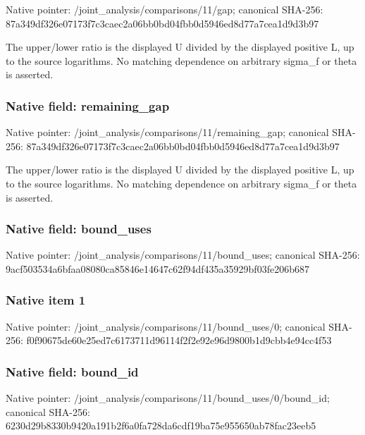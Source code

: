 \documentclass[10pt,a4paper]{article}
\begin{document}
Native pointer: /joint\_analysis/comparisons/11/gap; canonical SHA-256: 87a349df326e07173f7c3cae\allowbreak{}c2a06bb0bd04fbb0d5946ed8\allowbreak{}d77a7cea1d9d3b97


The upper/lower ratio is the displayed U divided by the displayed positive L, up to the source logarithms. No matching dependence on arbitrary sigma\_f or theta is asserted.


\subsubsection{Native field: remaining\_gap}


Native pointer: /joint\_analysis/comparis\allowbreak{}ons/11/remaining\_gap; canonical SHA-256: 87a349df326e07173f7c3cae\allowbreak{}c2a06bb0bd04fbb0d5946ed8\allowbreak{}d77a7cea1d9d3b97


The upper/lower ratio is the displayed U divided by the displayed positive L, up to the source logarithms. No matching dependence on arbitrary sigma\_f or theta is asserted.


\subsubsection{Native field: bound\_uses}


Native pointer: /joint\_analysis/comparis\allowbreak{}ons/11/bound\_uses; canonical SHA-256: 9acf503534a6bfaa08080ca8\allowbreak{}5846e14647c62f94df435a35\allowbreak{}929bf03fe206b687



\subsubsection{Native item 1}


Native pointer: /joint\_analysis/comparis\allowbreak{}ons/11/bound\_uses/0; canonical SHA-256: f0f90675de60e25ed7c61737\allowbreak{}11d96114f2f2e92e96d9800b\allowbreak{}1d9cbb4e94cc4f53



\subsubsection{Native field: bound\_id}


Native pointer: /joint\_analysis/comparis\allowbreak{}ons/11/bound\_uses/0/boun\allowbreak{}d\_id; canonical SHA-256: 6230d29b8330b9420a191b2f\allowbreak{}6a0fa728da6cdf19ba75e955\allowbreak{}650ab78fac23eeb5
\end{document}
